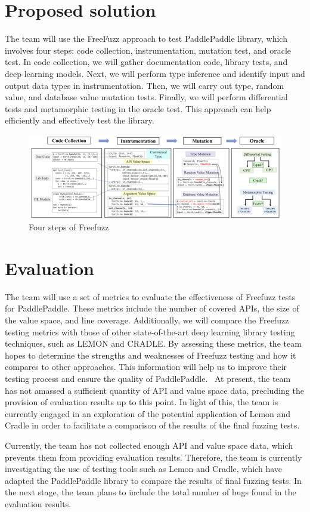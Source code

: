\documentclass[sigconf]{acmart}
\begin{document}
\section{Proposed solution}
The team will use the FreeFuzz approach to test PaddlePaddle library, which involves four steps: code collection, 
instrumentation, mutation test, and oracle test. In code collection, we will gather documentation code, library tests,
 and deep learning models. Next, we will perform type inference and identify input and output data types in instrumentation.
  Then, we will carry out type, random value, and database value mutation tests. Finally, we will perform differential tests 
  and metamorphic testing in the oracle test. This approach can help efficiently and effectively test the library.
  \begin{figure}[h]
    \centering
    \includegraphics[width=\linewidth]{4.png}
    \caption{Four steps of Freefuzz}
  \end{figure}  
\section{Evaluation}
The team will use a set of metrics to evaluate the effectiveness of Freefuzz tests for PaddlePaddle. 
These metrics include the number of covered APIs, the size of the value space, and line coverage. 
Additionally, we will compare the Freefuzz testing metrics with those of other state-of-the-art deep learning library testing techniques,
 such as LEMON and CRADLE. By assessing these metrics, the team hopes to determine the strengths and weaknesses of Freefuzz testing and how it compares to other approaches.
  This information will help us to improve their testing process and ensure the quality of PaddlePaddle.
 At present, the team has not amassed a sufficient quantity of API and value space data, precluding the provision of evaluation results up to this point. In light of this, 
the team is currently engaged in an exploration of the potential application of Lemon and Cradle in order to facilitate a comparison of the results of the final fuzzing tests.
\par Currently, the team has not collected enough API and value space data, which prevents them from providing evaluation results.
 Therefore, the team is currently investigating the use of testing tools such as Lemon and Cradle, which have adapted the PaddlePaddle library 
 to compare the results of final fuzzing tests. In the next stage, the team plans to include the total number of bugs found in the evaluation results.
\end{document}
